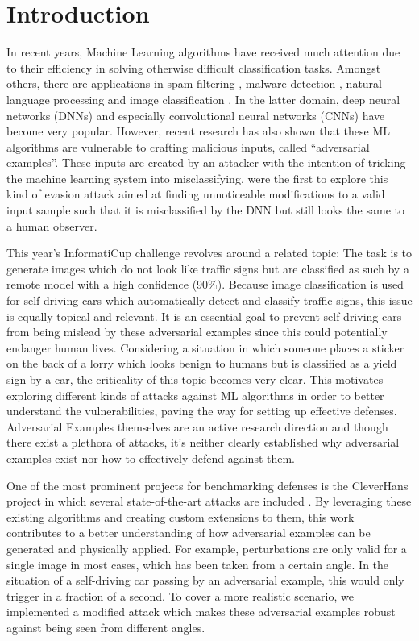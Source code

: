 \section{Introduction}

In recent years, Machine Learning algorithms have received much attention due to their efficiency in solving otherwise difficult classification tasks.
Amongst others, there are applications in spam filtering \cite{ruan2010three, clark2003neural}, malware detection \cite{dahl2013large}, natural language processing \cite{collobert2008unified} and image classification \cite{simonyan2014very, he2016deep}.
In the latter domain, deep neural networks (DNNs) and especially convolutional neural networks (CNNs) have become very popular.
However, recent research has also shown that these ML algorithms are vulnerable to crafting malicious inputs, called \enquote{adversarial examples}.
These inputs are created by an attacker with the intention of tricking the machine learning system into misclassifying.
\citet{szegedy2013intriguing} were the first to explore this kind of evasion attack aimed at finding unnoticeable modifications to a valid input sample such that it is misclassified by the DNN but still looks the same to a human observer.

This year's InformatiCup challenge revolves around a related topic: The task is to generate images which do not look like traffic signs but are classified as such by a remote model with a high confidence (90\%).
Because image classification is used for self-driving cars which automatically detect and classify traffic signs, this issue is equally topical and relevant.
It is an essential goal to prevent self-driving cars from being mislead by these adversarial examples since this could potentially endanger human lives.
Considering a situation in which someone places a sticker on the back of a lorry which looks benign to humans but is classified as a yield sign by a car, the criticality of this topic becomes very clear.
This motivates exploring different kinds of attacks against ML algorithms in order to better understand the vulnerabilities, paving the way for setting up effective defenses.
Adversarial Examples themselves are an active research direction and though there exist a plethora of attacks, it's neither clearly established why adversarial examples exist nor how to effectively defend against them.

One of the most prominent projects for benchmarking defenses is the CleverHans project in which several state-of-the-art attacks are included \cite{papernot2016cleverhans}.
By leveraging these existing algorithms and creating custom extensions to them, this work contributes to a better understanding of how adversarial examples can be generated and physically applied.
For example, perturbations are only valid for a single image in most cases, which has been taken from a certain angle.
In the situation of a self-driving car passing by an adversarial example, this would only trigger in a fraction of a second.
To cover a more realistic scenario, we implemented a modified attack which makes these adversarial examples robust against being seen from different angles.

